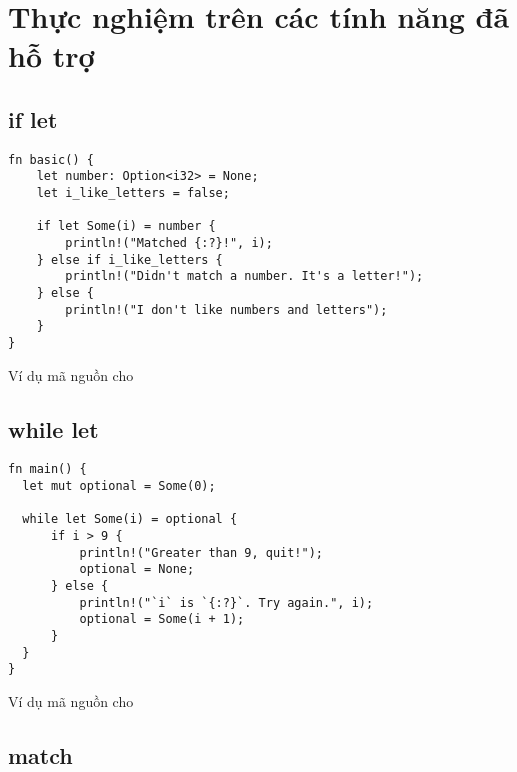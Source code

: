 \section{Thực nghiệm trên các tính năng đã hỗ trợ}

\subsection{if let}

\begin{listing}[H]
\begin{verbatim}
fn basic() {
    let number: Option<i32> = None;
    let i_like_letters = false;

    if let Some(i) = number {
        println!("Matched {:?}!", i);
    } else if i_like_letters {
        println!("Didn't match a number. It's a letter!");
    } else {
        println!("I don't like numbers and letters");
    }
}
\end{verbatim}
\caption{Ví dụ mã nguồn cho}
\label{code:c3_iflet}
\end{listing}

\subsection{while let}

\begin{listing}[H]
\begin{verbatim}
fn main() {
  let mut optional = Some(0);

  while let Some(i) = optional {
      if i > 9 {
          println!("Greater than 9, quit!");
          optional = None;
      } else {
          println!("`i` is `{:?}`. Try again.", i);
          optional = Some(i + 1);
      }
  }
}
\end{verbatim}
\caption{Ví dụ mã nguồn cho}
\label{code:c3_fn}
\end{listing}



\subsection{match}

